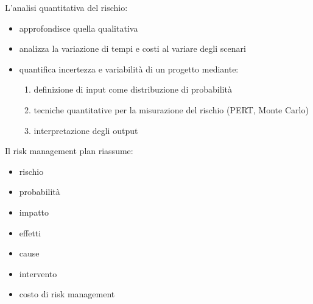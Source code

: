 \documentclass[answers, a4paper, 11pt]{exam}
\begin{document}
L'analisi quantitativa del rischio:

\begin{itemize}
    \item approfondisce quella qualitativa
    \item analizza la variazione di tempi e costi al variare degli scenari
    \item quantifica incertezza e variabilità di un progetto mediante:
    \begin{enumerate}
        \item definizione di input come distribuzione di probabilità
        \item tecniche quantitative per la misurazione del rischio (PERT, Monte Carlo)
        \item interpretazione degli output
    \end{enumerate}
\end{itemize}

Il risk management plan riassume:
\begin{itemize}
    \item rischio
    \item probabilità
    \item impatto
    \item effetti
    \item cause
    \item intervento
    \item costo di risk management
\end{itemize}
\end{document}
